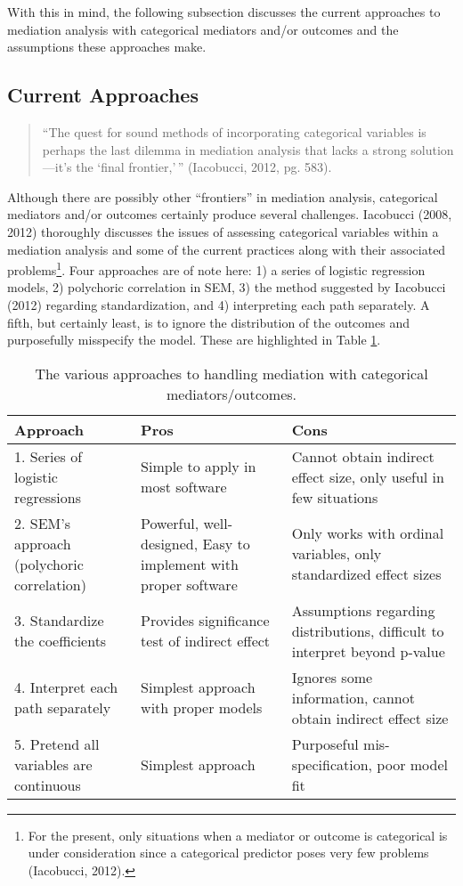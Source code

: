 \documentclass[]{DissertateUSU}
\let\rmarkdownfootnote\footnote%
\def\footnote{\protect\rmarkdownfootnote}
\begin{document}
With this in mind, the following subsection discusses the current
approaches to mediation analysis with categorical mediators and/or
outcomes and the assumptions these approaches make.

\subsection{Current Approaches}\label{current-approaches}

\begin{quote}
``The quest for sound methods of incorporating categorical variables is
perhaps the last dilemma in mediation analysis that lacks a strong
solution---it's the `final frontier,'\,'' (Iacobucci, 2012, pg. 583).
\end{quote}

Although there are possibly other ``frontiers'' in mediation analysis,
categorical mediators and/or outcomes certainly produce several
challenges. Iacobucci (2008, 2012) thoroughly discusses the issues of
assessing categorical variables within a mediation analysis and some of
the current practices along with their associated
problems\footnote{For the present, only situations when a mediator or outcome is categorical is under consideration since a categorical predictor poses very few problems (Iacobucci, 2012).}.
Four approaches are of note here: 1) a series of logistic regression
models, 2) polychoric correlation in SEM, 3) the method suggested by
Iacobucci (2012) regarding standardization, and 4) interpreting each
path separately. A fifth, but certainly least, is to ignore the
distribution of the outcomes and purposefully misspecify the model.
These are highlighted in Table \ref{tab_approaches}.

\begin{table}[tb]
\centering
\caption{The various approaches to handling mediation with categorical mediators/outcomes.} 
\label{tab_approaches}
\begin{tabular}{p{40mm}p{45mm}p{55mm}}
\toprule
Approach & Pros & Cons \\ 
\midrule
1. Series of logistic regressions & Simple to apply in most software & Cannot obtain indirect effect size, only useful in few situations \\ 
2. SEM's approach (polychoric correlation) & Powerful, well-designed, Easy to implement with proper software & Only works with ordinal variables, only standardized effect sizes \\ 
3. Standardize the coefficients & Provides significance test of indirect effect & Assumptions regarding distributions, difficult to interpret beyond p-value \\ 
4. Interpret each path separately & Simplest approach with proper models & Ignores some information, cannot obtain indirect effect size \\ 
5. Pretend all variables are continuous & Simplest approach & Purposeful mis-specification, poor model fit \\ 
\bottomrule
\end{tabular}
\end{table}
\end{document}
